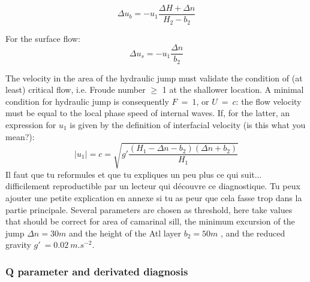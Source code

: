 \begin{equation}
\Delta u_b = -u_1 \frac{\Delta H + \Delta n}{H_2-b_2}
\end{equation}

For the surface flow:
\begin{equation}
\Delta u_s = - u_1\frac{\Delta n}{b_2}
\end{equation}

The velocity in the area of the hydraulic jump must validate the condition of (at least) critical flow, i.e. Froude number $\geq$ 1 at the shallower location. A minimal condition for hydraulic jump is consequently $F\ =\ 1$, or $U\ =\ c$: the flow velocity must be equal to the local phase speed of internal waves. If, for the latter, \color{blue} an expression for $u_1$ is given by the definition of interfacial velocity  \color{green}(is this what you mean?): \color{blue} 
\begin{equation}
|u_1|=c=\sqrt{g' \frac{(H_1-\Delta n - b_2)(\Delta n + b_2)}{H_1}}
\end{equation}
 \color{green}Il faut que tu reformules et que tu expliques un peu plus ce qui suit... difficilement reproductible par un lecteur qui découvre ce diagnostique. Tu peux ajouter une petite explication en annexe si tu as peur que cela fasse trop dans la partie principale. \color{black} 
Several parameters are chosen as threshold, here take values that should be correct for area of camarinal sill, the minimum excursion of the jump $\Delta n = 30m$ and the height of the Atl layer $b_2=50 m$ , and the reduced gravity $g'\ =0.02\ m.s^{-2}$.

\subsubsection{Q parameter and derivated diagnosis}

